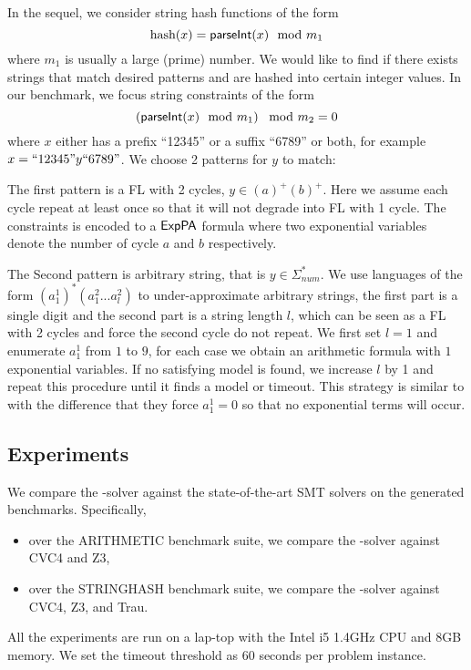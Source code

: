 {%

In the sequel, we consider string hash functions of the form  
\begin{equation}
    \text{hash}(x)= \textsf{parseInt}(x) \mod m_1  \notag
\end{equation}
where $m_1$ is usually a large (prime) number. We would like to find if there exists strings that match desired patterns and are hashed into certain integer values. In our benchmark, we focus string constraints of the form
\begin{equation}
    \left( \textsf{parseInt}(x) \mod m_1\right) \mod m_2 = 0   \notag
\end{equation}
where $x$ either has a prefix ``12345'' or a suffix ``6789'' or both, for example $x=``12345"y``6789"$. We choose 2 patterns for $y$ to match: 

The first pattern is a FL with 2 cycles, $y \in (a)^+(b)^+$. Here we assume each cycle repeat at least once so that it will not degrade into FL with 1 cycle. The constraints is encoded to a ${\sf ExpPA}$ formula where two exponential variables denote the number of cycle $a$ and $b$ respectively.

The Second pattern is arbitrary string, that is $y\in \Sigma_{num}^*$. We use languages of the form $(a^1_1)^* (a^2_1...a^2_l)$ to under-approximate arbitrary strings, the first part is a single digit and the second part is a string length $l$, which can be seen as a FL with 2 cycles and force the second cycle do not repeat. We first set $l=1$ and enumerate $a^1_1$ from $1$ to $9$, for each case we obtain an arithmetic formula with $1$ exponential variables. If no satisfying model is found, we increase $l$ by 1 and repeat this procedure until it finds a model or timeout. This strategy is similar to \cite{Abdulla2020} with the difference that they force $a^1_1=0$ so that no exponential terms will occur.
}

\subsection{Experiments}

We compare the {\paexp}-solver against the state-of-the-art SMT solvers on the generated benchmarks. Specifically, 
\begin{itemize}
\item over the ARITHMETIC benchmark suite, we compare the {\paexp}-solver against CVC4 and Z3,
\item over the STRINGHASH benchmark suite, we compare the {\paexp}-solver against CVC4, Z3, and Trau. 
\end{itemize}
All the experiments are run on a lap-top with the Intel i5 1.4GHz CPU and 8GB memory. We set the timeout threshold as 60 seconds per problem instance. 

